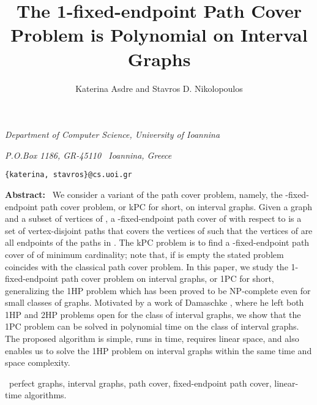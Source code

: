 \documentclass[10pt]{article}
\title{\bf The 1-fixed-endpoint Path Cover Problem is Polynomial on Interval Graphs \vspace{0.4cm}}
\author{\large Katerina Asdre \s and \s Stavros D. Nikolopoulos}
\date{}
\def\s{\ }
\begin{document}
\maketitle

\vspace{-0.6cm}

\centerline{\it Department of Computer Science, University of
Ioannina}

\centerline{\it P.O.Box 1186, GR-45110 \s Ioannina, Greece}

\centerline{\tt \{katerina, stavros\}@cs.uoi.gr}

\vskip 0.3in

\begin{center}
\noindent
\parbox{5.5in}
{{\bf Abstract:} \s We consider a variant of the path cover
problem, namely, the -fixed-endpoint path cover problem, or kPC
for short, on interval graphs. Given a graph  and a subset
 of  vertices of , a -fixed-endpoint path
cover of  with respect to  is a set of
vertex-disjoint paths  that covers the vertices of
 such that the  vertices of  are all endpoints
of the paths in . The kPC problem is to find a
-fixed-endpoint path cover of  of minimum cardinality; note
that, if  is empty the stated problem coincides with
the classical path cover problem. In this paper, we study the
1-fixed-endpoint path cover problem on interval graphs, or 1PC for
short, generalizing the 1HP problem which has been proved to be
NP-complete even for small classes of graphs. Motivated by a work
of Damaschke \cite{Damaschke}, where he left both 1HP and 2HP
problems open for the class of interval graphs, we show that the
1PC problem can be solved in polynomial time on the class of
interval graphs. The proposed algorithm is simple, runs in
 time, requires linear space, and also enables us to solve
the 1HP problem on interval graphs within the same time and space
complexity.


\bigskip
{} \s perfect graphs, interval graphs, path
cover, fixed-endpoint path cover, linear-time algorithms.}
\end{center}
\end{document}
